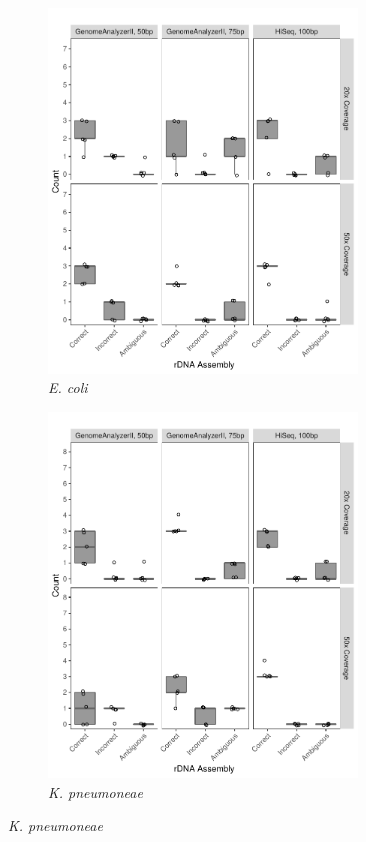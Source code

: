 \documentclass[10pt]{article}
\begin{document}
\begin{linenumbers}
\begin{figure}[!h]
  \centering
  \begin{subfigure}[b]{0.45\textwidth}
    \includegraphics[width=0.9\textwidth]{coli}
    \caption{\textit{E. coli}}
    \label{fig:sim_coli}
  \end{subfigure}
  \begin{subfigure}[b]{0.45\textwidth}
    \includegraphics[width=0.9\textwidth]{kleb}
    \caption{\textit{K. pneumoneae}}
    \label{fig:sim_kleb}
  \end{subfigure}


\end{figure}
\end{linenumbers}
\end{document}
